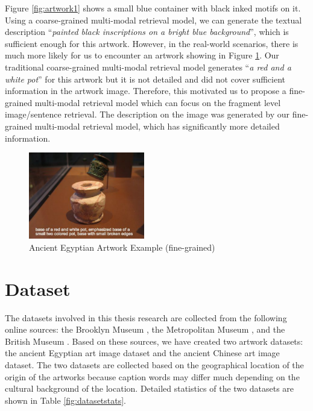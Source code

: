 Figure \ref{fig:artwork1} shows a small blue container with black inked motifs on it. Using a coarse-grained multi-modal retrieval model, we can generate the textual description ``\textit{painted black inscriptions on a bright blue background}'', which is sufficient enough for this artwork. However, in the real-world scenarios, there is much more likely for us to encounter an artwork showing in Figure \ref{fig:artwork2}. Our traditional coarse-grained multi-modal retrieval model generates ``\textit{a red and a white pot}'' for this artwork but it is not detailed and did not cover sufficient information in the artwork image. Therefore, this motivated us to propose a fine-grained multi-modal retrieval model which can focus on the fragment level image/sentence retrieval. The description on the image was generated by our fine-grained multi-modal retrieval model, which has significantly more detailed information.

\begin{figure}[h!]
\centering
\includegraphics[width=0.45\textwidth]{artwork_fine2.pdf}
\caption{Ancient Egyptian Artwork Example (fine-grained)}
\label{fig:artwork2}
\end{figure}

\section{Dataset}

The datasets involved in this thesis research are collected from the following online sources: the Brooklyn Museum \cite{brooklynmuseum}, the Metropolitan Museum \cite{themet}, and the British Museum \cite{thebritishmuseum}. Based on these sources, we have created two artwork datasets: the ancient Egyptian art image dataset and the ancient Chinese art image dataset. The two datasets are collected based on the geographical location of the origin of the artworks because caption words may differ much depending on the cultural background of the location. Detailed statistics of the two datasets are shown in Table \ref{fig:datasetstats}. 

